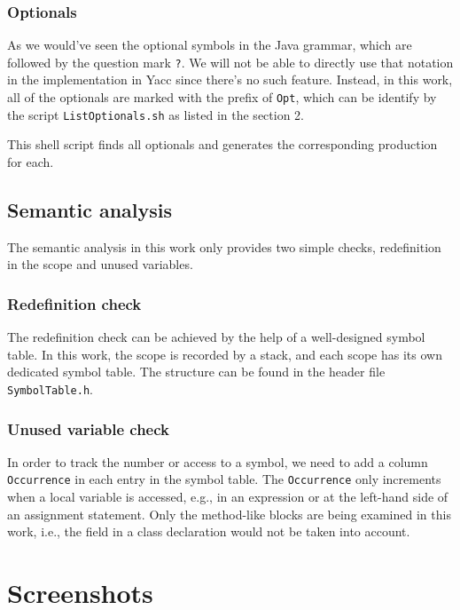 \documentclass[12pt]{article}
\begin{document}
\subsubsection{Optionals}
As we would've seen the optional symbols in the Java grammar, which are followed by the question mark \texttt{?}. We will not be able to directly use that notation in the implementation in Yacc since there's no such feature. Instead, in this work, all of the optionals are marked with the prefix of \texttt{Opt}, which can be identify by the script \texttt{ListOptionals.sh} as listed in the section 2.

This shell script finds all optionals and generates the corresponding production for each.


\subsection{Semantic analysis}
The semantic analysis in this work only provides two simple checks, redefinition in the scope and unused variables.
\subsubsection{Redefinition check}
The redefinition check can be achieved by the help of a well-designed symbol table. In this work, the scope is recorded by a stack, and each scope has its own dedicated symbol table. The structure can be found in the header file \texttt{SymbolTable.h}.

\subsubsection{Unused variable check}
In order to track the number or access to a symbol, we need to add a column \texttt{Occurrence} in each entry in the symbol table. The \texttt{Occurrence} only increments when a local variable is accessed, e.g., in an expression or at the left-hand side of an assignment statement. Only the method-like blocks are being examined in this work, i.e., the field in a class declaration would not be taken into account.

\section{Screenshots}
\newpage
\end{document}

